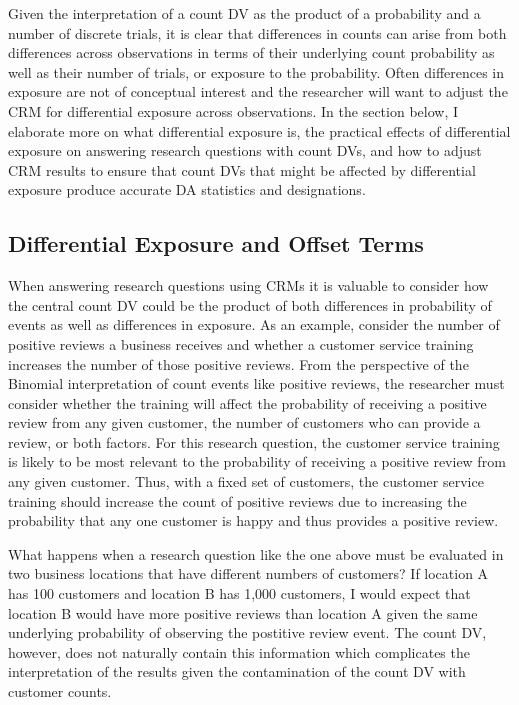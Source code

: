 \documentclass[ShortAfour,times,sageapa]{sagej}
\begin{document}
	Given the interpretation of a count DV as the product of a probability and a number of discrete trials, it is clear that differences in counts can arise from both differences across observations in terms of their underlying count probability as well as their number of trials, or exposure to the probability.
	Often differences in exposure are not of conceptual interest and the researcher will want to adjust the CRM for differential exposure across observations.
	In the section below, I elaborate more on what differential exposure is, the practical effects of differential exposure on answering research questions with count DVs, and how to adjust CRM results to ensure that count DVs that might be affected by differential exposure produce accurate DA statistics and designations.

	\subsection{Differential Exposure and Offset Terms}
	
	
	When answering research questions using CRMs it is valuable to consider how the central count DV could be the product of both differences in probability of events as well as differences in exposure. 
	As an example, consider the number of positive reviews a business receives and whether a customer service training increases the number of those positive reviews.
	From the perspective of the Binomial interpretation of count events like positive reviews, the researcher must consider whether the training will affect the probability of receiving a positive review from any given customer, the number of customers who can provide a review, or both factors.
	For this research question, the customer service training is likely to be most relevant to the probability of receiving a positive review from any given customer.
	Thus, with a fixed set of customers, the customer service training should increase the count of positive reviews due to increasing the probability that any one customer is happy and thus provides a positive review.
	
	What happens when a research question like the one above must be evaluated in two business locations that have different numbers of customers?
	If location A has 100 customers and location B has 1,000 customers, I would expect that location B would have more positive reviews than location A given the same underlying probability of observing the postitive review event.	
	The count DV, however, does not naturally contain this information which complicates the interpretation of the results given the contamination of the count DV with customer counts.
	
\end{document}
